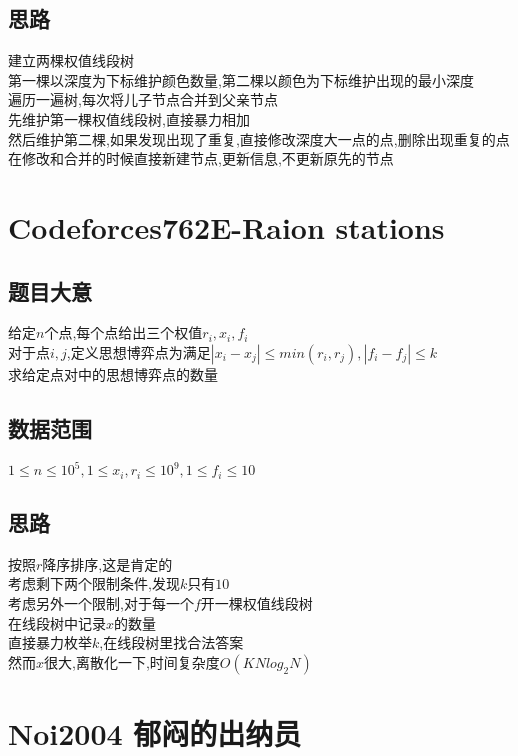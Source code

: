 \documentclass{ctexart}
\numberwithin{equation}{section}
\begin{document}
\begin{flushleft}
  \subsection{思路}
  建立两棵权值线段树\\
  第一棵以深度为下标维护颜色数量,第二棵以颜色为下标维护出现的最小深度\\
  遍历一遍树,每次将儿子节点合并到父亲节点\\
  先维护第一棵权值线段树,直接暴力相加\\
  然后维护第二棵,如果发现出现了重复,直接修改深度大一点的点,删除出现重复的点\\

  在修改和合并的时候直接新建节点,更新信息,不更新原先的节点\\
  \newpage

  \section{Codeforces762E-Raion stations}
  \subsection{题目大意}
  给定$n$个点,每个点给出三个权值$r_i,x_i,f_i$\\
  对于点$i,j$,定义思想博弈点为满足$|x_i-x_j|\leq min(r_i,r_j), |f_i-f_j|\leq k$\\
  求给定点对中的思想博弈点的数量\\
  \subsection{数据范围}
  $1\le n\le 10^5, 1\leq x_i,r_i\leq 10^9, 1\leq f_i \leq 10$\\
  \subsection{思路}
  按照$r$降序排序,这是肯定的\\
  考虑剩下两个限制条件,发现$k$只有$10$\\
  考虑另外一个限制,对于每一个$f$开一棵权值线段树\\
  在线段树中记录$x$的数量\\
  直接暴力枚举$k$,在线段树里找合法答案\\
  然而$x$很大,离散化一下,时间复杂度$O(KNlog_2N)$\\
  \newpage

  \section{Noi2004 郁闷的出纳员}

\end{flushleft}
\end{document}
